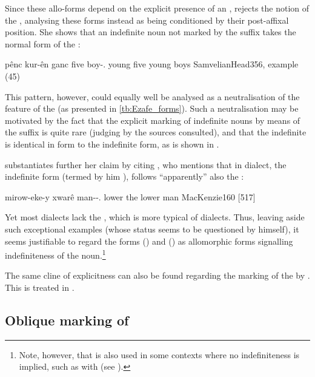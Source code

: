   
  Since these allo-forms depend on the explicit presence of an , \citet[355-357]{SamvelianHead} rejects the notion of the , analysing these forms instead as being conditioned by their post-affixal position. She shows that an indefinite \pl* noun not marked by the suffix  takes the normal form of the \ez*  {}:
  
  {pênc kur-ên ganc}
  {five boy-\ez.\pl{} young}
  {five young boys}
  {SamvelianHead}{356, example (45)}
  
  This pattern, however, could equally well be analysed as a neutralisation of the  feature of the \pl* \ez* (as presented in \vref{tb:Ezafe_forms}). Such a neutralisation may be motivated by the fact that the explicit marking of \pl* indefinite nouns by means of the   suffix  is quite rare (judging by the sources consulted), and that the indefinite \pl* \ez* {} is  identical in form to the indefinite \fem* form, as is shown in .
  
  \citet[356]{SamvelianHead} substantiates further her claim by citing   \citet[158]{MacKenzie}, who mentions that in \Sur dialect, the indefinite form (termed by him ), follows \enquote{apparently} also the  :
  
  {mirow-eke-y xwarê}
  {man--\ez.\masc{} lower}
  {the lower man}
  {MacKenzie}{160 {[517]}}
   
  Yet  most \Kur dialects lack the  , which is more typical of \Sor dialects. Thus, leaving aside such exceptional examples (whose status seems to be questioned by \citeauthor{MacKenzie} himself), it seems justifiable to regard the \sg* \ez* forms  (\masc) and  (\fem) as allomorphic forms signalling indefiniteness of the \prim noun.\footnote{Note, however, that  is also used in some contexts where no indefiniteness is implied, such as with  \prims (see ).}
  
  


The same cline of explicitness can also be found regarding the marking of the \secn by  . This is treated in .




\subsection{Oblique marking of \secns} \label{ss:Kurd_obl}


